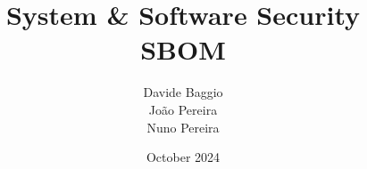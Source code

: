 \documentclass[12pt]{article}
\title{System \& Software Security \\ SBOM}
\author{Davide Baggio \\ João Pereira \\ Nuno Pereira}
\date{October 2024}
\begin{document}
\begin{titlepage}
    \maketitle
    \thispagestyle{empty}

    \vfill

    \tableofcontents

    \vfill

    
\end{titlepage}








\newpage
\printbibliography
\end{document}
